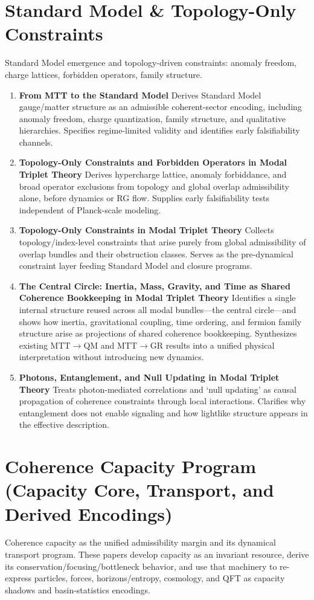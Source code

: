 \documentclass[11pt]{article}
\begin{document}
\section{Standard Model \& Topology-Only Constraints}
Standard Model emergence and topology-driven constraints: anomaly freedom, charge lattices, forbidden operators, family structure.

\begin{enumerate}[leftmargin=*]
\item \textbf{From MTT to the Standard Model} Derives Standard Model gauge/matter structure as an admissible coherent-sector encoding, including anomaly freedom, charge quantization, family structure, and qualitative hierarchies. Specifies regime-limited validity and identifies early falsifiability channels.
\item \textbf{Topology-Only Constraints and Forbidden Operators in Modal Triplet Theory} Derives hypercharge lattice, anomaly forbiddance, and broad operator exclusions from topology and global overlap admissibility alone, before dynamics or RG flow. Supplies early falsifiability tests independent of Planck-scale modeling.
\item \textbf{Topology-Only Constraints in Modal Triplet Theory} Collects topology/index-level constraints that arise purely from global admissibility of overlap bundles and their obstruction classes. Serves as the pre-dynamical constraint layer feeding Standard Model and closure programs.
\item \textbf{The Central Circle: Inertia, Mass, Gravity, and Time as Shared Coherence Bookkeeping in Modal Triplet Theory}
Identifies a single internal structure reused across all modal bundles—the central circle—and shows how inertia, gravitational coupling, time ordering, and fermion family structure arise as projections of shared coherence bookkeeping. Synthesizes existing MTT$\rightarrow$QM and MTT$\rightarrow$GR results into a unified physical interpretation without introducing new dynamics.
\item \textbf{Photons, Entanglement, and Null Updating in Modal Triplet Theory} Treats photon-mediated correlations and ‘null updating’ as causal propagation of coherence constraints through local interactions. Clarifies why entanglement does not enable signaling and how lightlike structure appears in the effective description.
\end{enumerate}

\section{Coherence Capacity Program (Capacity Core, Transport, and Derived Encodings)}
Coherence capacity as the unified admissibility margin and its dynamical transport program. These papers
develop capacity as an invariant resource, derive its conservation/focusing/bottleneck behavior, and
use that machinery to re-express particles, forces, horizons/entropy, cosmology, and QFT as capacity
shadows and basin-statistics encodings.
\end{document}

